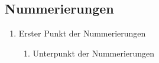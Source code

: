 \subsection[]{Nummerierungen}
\begin{enumerate}
\item Erster Punkt der Nummerierungen
    \begin{enumerate}
    \item Unterpunkt der Nummerierungen
    \end{enumerate}
\end{enumerate}


% 
% 
% 
% 
% 
% 
